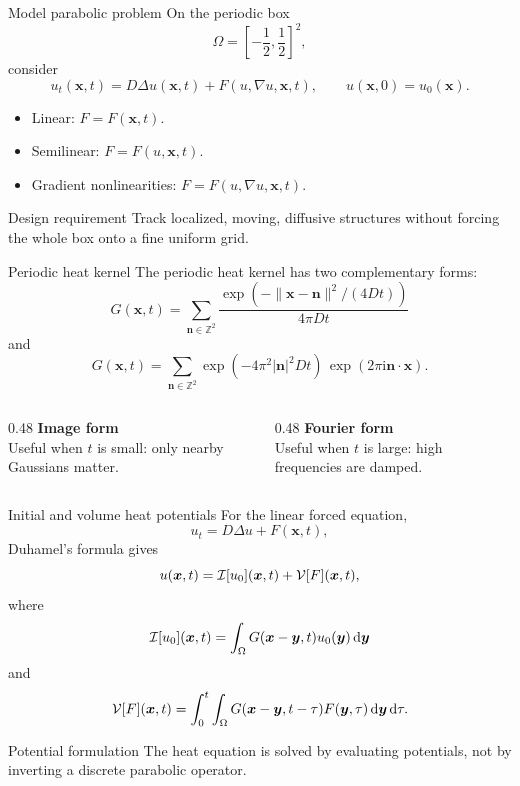 \documentclass[aspectratio=169,10pt]{beamer}
\newcommand{\Z}{\mathbb{Z}}
\newcommand{\dd}{\,\mathrm d}
\newcommand{\ii}{\mathrm i}
\newcommand{\x}{\bm{x}}
\newcommand{\y}{\bm{y}}
\begin{document}
\begin{frame}{Model parabolic problem}
\small
On the periodic box
\[
  \Omega=\left[-\frac12,\frac12\right]^2,
\]
consider
\[
  u_t(\x,t)=D\Delta u(\x,t)+F(u,\nabla u,\x,t),
  \qquad u(\x,0)=u_0(\x).
\]

\begin{itemize}
  \item Linear: $F=F(\x,t)$.
  \item Semilinear: $F=F(u,\x,t)$.
  \item Gradient nonlinearities: $F=F(u,\nabla u,\x,t)$.
\end{itemize}

\begin{block}{Design requirement}
Track localized, moving, diffusive structures without forcing the whole box
onto a fine uniform grid.
\end{block}
\end{frame}

\begin{frame}{Periodic heat kernel}
\small
The periodic heat kernel has two complementary forms:
\[
G(\x,t)=
  \sum_{\bm n\in\Z^2}
  \frac{\exp(-\|\x-\bm n\|^2/(4Dt))}{4\pi Dt}
\]
and
\[
G(\x,t)=
  \sum_{\bm n\in\Z^2}
  \exp(-4\pi^2|\bm n|^2Dt)\,
  \exp(2\pi\ii \bm n\cdot \x).
\]

\begin{columns}[T,totalwidth=\textwidth]
\begin{column}{0.48\textwidth}
\textbf{Image form}\\
Useful when $t$ is small: only nearby Gaussians matter.
\end{column}
\begin{column}{0.48\textwidth}
\textbf{Fourier form}\\
Useful when $t$ is large: high frequencies are damped.
\end{column}
\end{columns}
\end{frame}

\begin{frame}{Initial and volume heat potentials}
\small
For the linear forced equation,
\[
  u_t=D\Delta u+F(\x,t),
\]
Duhamel's formula gives
\[
  u(\x,t)=\Iop[u_0](\x,t)+\Vop[F](\x,t),
\]
where
\[
  \Iop[u_0](\x,t)=\int_{\Omega}G(\x-\y,t)u_0(\y)\dd\y
\]
and
\[
  \Vop[F](\x,t)=\int_0^t\int_{\Omega}
  G(\x-\y,t-\tau)F(\y,\tau)\dd\y\dd\tau.
\]

\begin{block}{Potential formulation}
The heat equation is solved by evaluating potentials, not by inverting
a discrete parabolic operator.
\end{block}
\end{frame}
\end{document}
